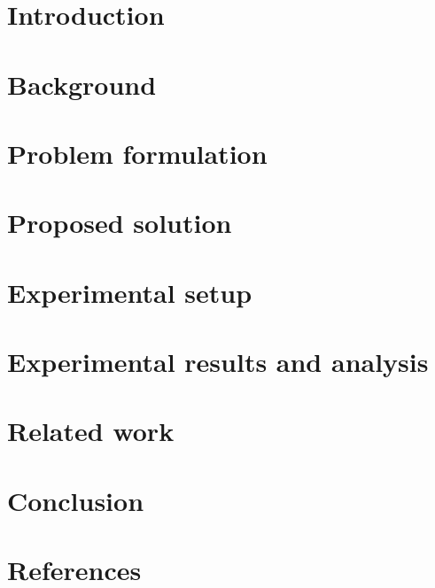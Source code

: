 \documentclass[review]{elsarticle}
\begin{document}

\section{Introduction} \label{sec:introduction}


\section{Background}\label{sec:background}


\section{Problem formulation}\label{sec:problem}


\section{Proposed solution}\label{sec:methods}


\section{Experimental setup}\label{sec:experimental_setup}


\section{Experimental results and analysis}\label{sec:experimental_result}


\section{Related work}\label{sec:rw}


\section{Conclusion} \label{sec:conclusions}


\section*{References}


\end{document}
